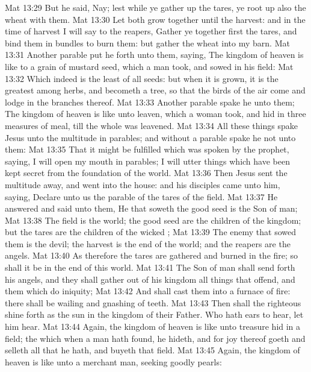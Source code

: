 \vs Mat 13:29 But he said, Nay; lest while ye gather up the tares, ye root up also the wheat with them.
\vs Mat 13:30 Let both grow together until the harvest: and in the time of harvest I will say to the reapers, Gather ye together first the tares, and bind them in bundles to burn them: but gather the wheat into my barn.
\vs Mat 13:31 Another parable put he forth unto them, saying, The kingdom of heaven is like to a grain of mustard seed, which a man took, and sowed in his field:
\vs Mat 13:32 Which indeed is the least of all seeds: but when it is grown, it is the greatest among herbs, and becometh a tree, so that the birds of the air come and lodge in the branches thereof.
\vs Mat 13:33 Another parable spake he unto them; The kingdom of heaven is like unto leaven, which a woman took, and hid in three measures of meal, till the whole was leavened.
\vs Mat 13:34 All these things spake Jesus unto the multitude in parables; and without a parable spake he not unto them:
\vs Mat 13:35 That it might be fulfilled which was spoken by the prophet, saying, I will open my mouth in parables; I will utter things which have been kept secret from the foundation of the world.
\vs Mat 13:36 Then Jesus sent the multitude away, and went into the house: and his disciples came unto him, saying, Declare unto us the parable of the tares of the field.
\vs Mat 13:37 He answered and said unto them, He that soweth the good seed is the Son of man;
\vs Mat 13:38 The field is the world; the good seed are the children of the kingdom; but the tares are the children of the wicked ;
\vs Mat 13:39 The enemy that sowed them is the devil; the harvest is the end of the world; and the reapers are the angels.
\vs Mat 13:40 As therefore the tares are gathered and burned in the fire; so shall it be in the end of this world.
\vs Mat 13:41 The Son of man shall send forth his angels, and they shall gather out of his kingdom all things that offend, and them which do iniquity;
\vs Mat 13:42 And shall cast them into a furnace of fire: there shall be wailing and gnashing of teeth.
\vs Mat 13:43 Then shall the righteous shine forth as the sun in the kingdom of their Father. Who hath ears to hear, let him hear.
\vs Mat 13:44 Again, the kingdom of heaven is like unto treasure hid in a field; the which when a man hath found, he hideth, and for joy thereof goeth and selleth all that he hath, and buyeth that field.
\vs Mat 13:45 Again, the kingdom of heaven is like unto a merchant man, seeking goodly pearls:
